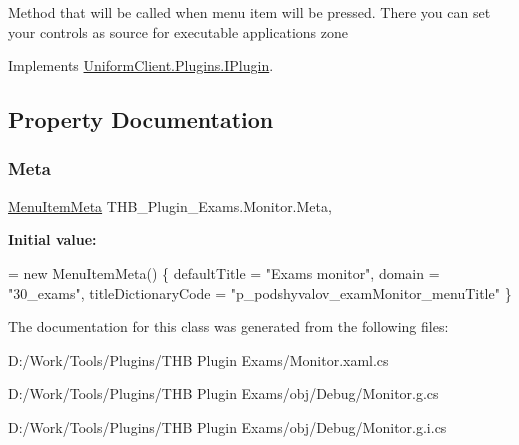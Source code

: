 Method that will be called when menu item will be pressed. There you can set your controls as source for executable application\textquotesingle{}s zone 



Implements \mbox{\hyperlink{interface_uniform_client_1_1_plugins_1_1_i_plugin_a1ca2220c7ce4a23f8f41af10efccf328}{Uniform\+Client.\+Plugins.\+I\+Plugin}}.



\subsection{Property Documentation}
\mbox{\label{class_t_h_b___plugin___exams_1_1_monitor_ac96dc019e2e0865c1c3b9a48a74a7015}} 
\subsubsection{\texorpdfstring{Meta}{Meta}}
{\footnotesize\ttfamily \mbox{\hyperlink{class_uniform_client_1_1_plugins_1_1_menu_item_meta}{Menu\+Item\+Meta}} T\+H\+B\+\_\+\+Plugin\+\_\+\+Exams.\+Monitor.\+Meta\hspace{0.3cm}{\ttfamily [get]}, {\ttfamily [set]}}

{\bfseries Initial value\+:}
\begin{DoxyCode}
= \textcolor{keyword}{new} MenuItemMeta()
        \{
            defaultTitle = \textcolor{stringliteral}{"Exams monitor"},
            domain = \textcolor{stringliteral}{"30\_exams"},
            titleDictionaryCode = \textcolor{stringliteral}{"p\_podshyvalov\_examMonitor\_menuTitle"}
        \}
\end{DoxyCode}


The documentation for this class was generated from the following files\+:\begin{DoxyCompactItemize}
\item 
D\+:/\+Work/\+Tools/\+Plugins/\+T\+H\+B Plugin Exams/Monitor.\+xaml.\+cs\item 
D\+:/\+Work/\+Tools/\+Plugins/\+T\+H\+B Plugin Exams/obj/\+Debug/Monitor.\+g.\+cs\item 
D\+:/\+Work/\+Tools/\+Plugins/\+T\+H\+B Plugin Exams/obj/\+Debug/Monitor.\+g.\+i.\+cs\end{DoxyCompactItemize}
